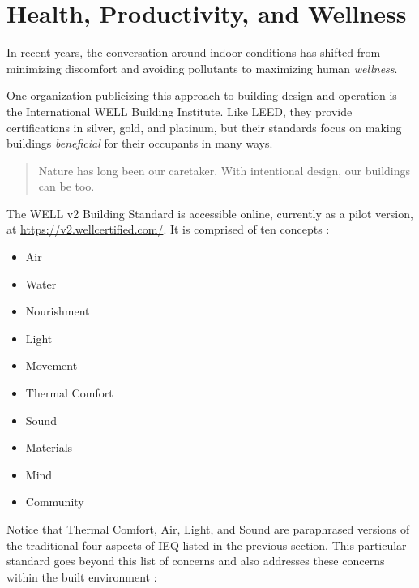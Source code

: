 \documentclass[10pt]{article}
\begin{document}
\section{Health, Productivity, and Wellness}

In recent years, the conversation around indoor conditions has shifted from minimizing discomfort and avoiding pollutants to maximizing human \textit{wellness}. 

One organization publicizing this approach to building design and operation is the International WELL Building Institute. Like LEED, they provide certifications in silver, gold, and platinum, but their standards focus on making buildings \textit{beneficial} for their occupants in many ways.

\begin{quote}
    Nature has long been our caretaker. With intentional design, our buildings can be too. \cite{noauthor_undated-tn}
\end{quote}


The WELL v2 Building Standard is accessible online, currently as a pilot version, at \url{https://v2.wellcertified.com/}. It is comprised of ten concepts \cite{noauthor_undated-tn}:

\vspace{-6pt}
\begin{itemize}
    \setlength{\itemsep}{0pt}%
    \setlength{\parskip}{0pt}%
    \item Air
    \item Water
    \item Nourishment
    \item Light
    \item Movement
    \item Thermal Comfort
    \item Sound
    \item Materials
    \item Mind
    \item Community
\end{itemize}

Notice that Thermal Comfort, Air, Light, and Sound are paraphrased versions of the traditional four aspects of IEQ listed in the previous section. This particular standard goes beyond this list of concerns and also addresses these concerns within the built environment \cite{noauthor_undated-tn}:
\end{document}
